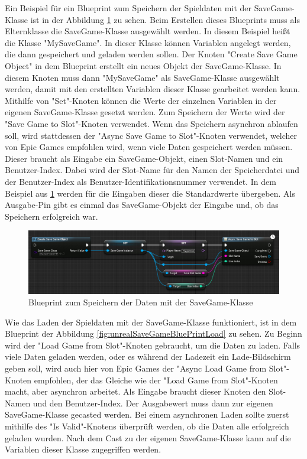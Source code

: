 Ein Beispiel für ein Blueprint zum Speichern der Spieldaten mit der SaveGame-Klasse ist in der Abbildung \ref{fig:unrealSaveGameBluePrintSave} zu sehen. Beim Erstellen dieses Blueprints muss als Elternklasse die SaveGame-Klasse ausgewählt werden. In diesem Beispiel heißt die Klasse "MySaveGame". In dieser Klasse können Variablen angelegt werden, die dann gespeichert und geladen werden sollen. Der Knoten "Create Save Game Object" in dem Blueprint erstellt ein neues Objekt der SaveGame-Klasse. In diesem Knoten muss dann "MySaveGame" als SaveGame-Klasse ausgewählt werden, damit mit den erstellten Variablen dieser Klasse gearbeitet werden kann. Mithilfe von "Set"-Knoten können die Werte der einzelnen Variablen in der eigenen SaveGame-Klasse gesetzt werden. Zum Speichern der Werte wird der "Save Game to Slot"-Knoten verwendet. Wenn das Speichern asynchron ablaufen soll, wird stattdessen der "Async Save Game to Slot"-Knoten verwendet, welcher von Epic Games empfohlen wird, wenn viele Daten gespeichert werden müssen. Dieser braucht als Eingabe ein SaveGame-Objekt, einen Slot-Namen und ein Benutzer-Index. Dabei wird der Slot-Name für den Namen der Speicherdatei und der Benutzer-Index als Benutzer-Identifikationsnummer verwendet. In dem Beispiel aus \ref{fig:unrealSaveGameBluePrintSave} werden für die Eingaben dieser die Standardwerte übergeben. Als Ausgabe-Pin gibt es einmal das SaveGame-Objekt der Eingabe und, ob das Speichern erfolgreich war.\cite{unrealengineSavingLoading}

\begin{figure}[htp]
    \centering
    \includegraphics[width=1\textwidth]{images/SaveGameBP.png}
    \caption{Blueprint zum Speichern der Daten mit der SaveGame-Klasse\cite{unrealengineSavingLoading}}
    \label{fig:unrealSaveGameBluePrintSave}
\end{figure}

Wie das Laden der Spieldaten mit der SaveGame-Klasse funktioniert, ist in dem Blueprint der Abbildung \ref{fig:unrealSaveGameBluePrintLoad} zu sehen. Zu Beginn wird der "Load Game from Slot"-Knoten gebraucht, um die Daten zu laden. Falls viele Daten geladen werden, oder es während der Ladezeit ein Lade-Bildschirm geben soll, wird auch hier von Epic Games der "Async Load Game from Slot"-Knoten empfohlen, der das Gleiche wie der "Load Game from Slot"-Knoten macht, aber asynchron arbeitet. Als Eingabe braucht dieser Knoten den Slot-Namen und den Benutzer-Index. Der Ausgabewert muss dann zur eigenen SaveGame-Klasse gecasted werden. Bei einem asynchronen Laden sollte zuerst mithilfe des "Is Valid"-Knotens überprüft werden, ob die Daten alle erfolgreich geladen wurden. Nach dem Cast zu der eigenen SaveGame-Klasse kann auf die Variablen dieser Klasse zugegriffen werden.\cite{unrealengineSavingLoading}

